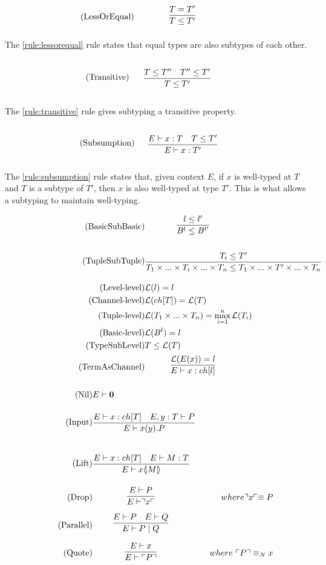 \begin{align*}
\tag{LessOrEqual}\label{rule:lessorequal} &\infrule{T=T'}{T\leq T'}
\end{align*}

The \ref{rule:lessorequal} rule states that equal types are also subtypes of each other.

\begin{align*}
\tag{Transitive}\label{rule:transitive} &\infrule{T\leq T''\quad T''\leq T'}{T\leq T'}
\end{align*}

The \ref{rule:transitive} rule gives subtyping a transitive property.

\begin{align*}
\tag{Subsumption}\label{rule:subsumption} &\infrule{E\vdash x:T\quad T\leq T'}{E\vdash x:T'}
\end{align*}

The \ref{rule:subsumption} rule states that, given context $E$, if $x$ is well-typed at $T$ and $T$ is a subtype of $T'$, then $x$ is also well-typed at type $T'$. This is what allows a subtyping to maintain well-typing.

\begin{align*}
\tag{BasicSubBasic} &\infrule{l\leq l'}{B^l\leq B^{l'}}\\
\tag{TupleSubTuple} &\infrule{T_i\leq T'}{T_1\times...\times T_i\times...\times T_n\leq T_1\times...\times T'\times...\times T_n}\\
\tag{Level-level} &\level{l}=l\\
\tag{Channel-level} &\level{ch[T]} = \level{T}\\
\tag{Tuple-level} &\level{T_1\times...\times T_n}=\max_{i=1}^{n}{\level{T_i}}\\
\tag{Basic-level} &\level{B^l}=l\\
\tag{TypeSubLevel} &T\leq \level{T}\\
\tag{TermAsChannel} &\infrule{\level{E(x)}=l}{E\vdash x:ch[l]}
\end{align*}

\begin{align*}
\tag{Nil} &E \vdash \nil\\
\tag{Input} &\infrule{E\vdash x:ch[T]\quad E,y:T\vdash P}{E \vdash \inp{x}{y}P}\\
\tag{Lift} &\infrule{E\vdash x:ch[T]\quad E \vdash M:T}{E\vdash \lift{x}{M}}\\
\tag{Drop} &\infrule{E \vdash P}{E\vdash \drop{x}}& where \drop{x} \equiv P\\
\tag{Parallel} &\infrule{E\vdash P \quad E \vdash Q}{E \vdash P \para Q}\\
\tag{Quote} &\infrule{E \vdash x}{E\vdash \quot{P}}& where\ \quot{P} \equiv_N x
\end{align*}

